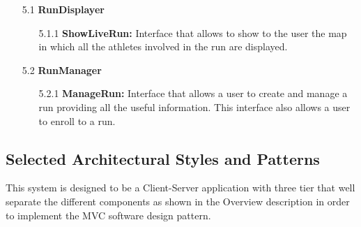 \begin{enumerate}
\item[5.1] \textbf{RunDisplayer}
	\begin{enumerate}
		\item[5.1.1] \textbf{ShowLiveRun:} Interface that allows to show to the user the map in which all the athletes involved in the run are displayed.
	\end{enumerate}	

\item[5.2] \textbf{RunManager}
	\begin{enumerate}
		\item[5.2.1] \textbf{ManageRun:} Interface that allows a user to create and manage a run providing all the useful information. This interface also allows a user to enroll to a run.
	\end{enumerate}		
\clearpage
\end{enumerate}
\clearpage



\subsection{Selected Architectural Styles and Patterns}

This system is designed to be a Client-Server application with three tier that well separate the different components as shown in the Overview description in order to implement the MVC software design pattern.

